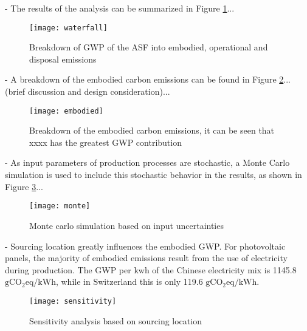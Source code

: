 
- The results of the analysis can be summarized in Figure \ref{fig:waterfall}...

\begin{figure}[H]
\begin{center}
\texttt{[image: waterfall]}
\caption{Breakdown of GWP of the ASF into embodied, operational and disposal emissions}
\label{fig:waterfall}
\end{center}
\end{figure}

- A breakdown of the embodied carbon emissions can be found in Figure  \ref{fig:embodied}... (brief discussion and design consideration)...

\begin{figure}[H]
\begin{center}
\texttt{[image: embodied]}
\caption{Breakdown of the embodied carbon emissions, it can be seen that xxxx has the greatest GWP contribution}
\label{fig:embodied}
\end{center}
\end{figure}



- As input parameters of production processes are stochastic, a Monte Carlo simulation is used to include this stochastic behavior in the results, as shown in Figure \ref{fig:monte}...

\begin{figure}[H]
\begin{center}
\texttt{[image: monte]}
\caption{Monte carlo simulation based on input uncertainties}
\label{fig:monte}
\end{center}
\end{figure}

- Sourcing location greatly influences the embodied GWP. For photovoltaic panels, the majority of embodied emissions result from the use of electricity during production. The GWP per kwh of the Chinese electricity mix is 1145.8 ${\mathrm{gCO_2eq/kWh}}$, while in Switzerland this is only 119.6 ${\mathrm{gCO_2eq/kWh}}$.

\begin{figure}[H]
\begin{center}
\texttt{[image: sensitivity]}
\caption{Sensitivity analysis based on sourcing location}
\label{fig:sensitivity}
\end{center}
\end{figure}
